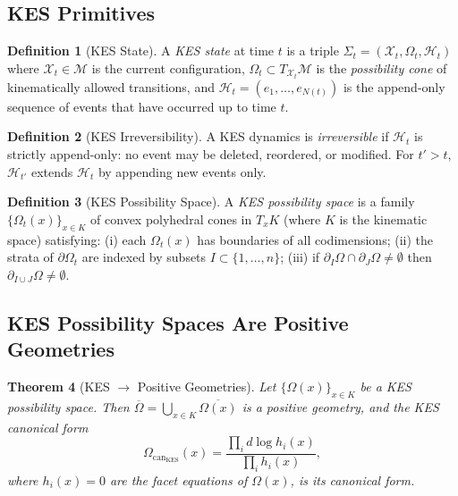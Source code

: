 \documentclass[12pt, oneside]{amsart}
\theoremstyle{plain}
\newtheorem{theorem}{Theorem}[section]
\theoremstyle{definition}
\newtheorem{definition}[theorem]{Definition}
\theoremstyle{remark}
\newcommand{\XKS}{\mathcal{X}}
\newcommand{\OmKS}{\Omega}
\newcommand{\HKS}{\mathcal{H}}
\newcommand{\CF}{\Omega_{\mathrm{can}}}
\begin{document}
\subsection{KES Primitives}

\begin{definition}[KES State]
\label{def:kes-state}
A \emph{KES state} at time $t$ is a triple $\Sigma_t = (\XKS_t, \OmKS_t, \HKS_t)$ where $\XKS_t \in \mathcal{M}$ is the current configuration, $\OmKS_t \subset T_{\XKS_t}\mathcal{M}$ is the \emph{possibility cone} of kinematically allowed transitions, and $\HKS_t = (e_1, \ldots, e_{N(t)})$ is the append-only sequence of events that have occurred up to time $t$.
\end{definition}

\begin{definition}[KES Irreversibility]
A KES dynamics is \emph{irreversible} if $\HKS_t$ is strictly append-only: no event may be deleted, reordered, or modified. For $t' > t$, $\HKS_{t'}$ extends $\HKS_t$ by appending new events only.
\end{definition}

\begin{definition}[KES Possibility Space]
A \emph{KES possibility space} is a family $\{\OmKS_t(x)\}_{x \in K}$ of convex polyhedral cones in $T_x K$ (where $K$ is the kinematic space) satisfying: (i) each $\OmKS_t(x)$ has boundaries of all codimensions; (ii) the strata of $\partial\OmKS_t$ are indexed by subsets $I \subset \{1,\ldots,n\}$; (iii) if $\partial_I\OmKS \cap \partial_J\OmKS \neq \emptyset$ then $\partial_{I \cup J}\OmKS \neq \emptyset$.
\end{definition}

\subsection{KES Possibility Spaces Are Positive Geometries}

\begin{theorem}[KES $\to$ Positive Geometries]
\label{thm:kes-pg}
Let $\{\OmKS(x)\}_{x \in K}$ be a KES possibility space. Then $\overline{\OmKS} = \bigcup_{x \in K} \overline{\OmKS(x)}$ is a positive geometry, and the KES canonical form
\begin{equation}
\label{eq:kes-cf}
  \CF_{\mathrm{KES}}(x) = \frac{\prod_i d\log h_i(x)}{\prod_i h_i(x)},
\end{equation}
where $h_i(x) = 0$ are the facet equations of $\OmKS(x)$, is its canonical form.
\end{theorem}
\end{document}

